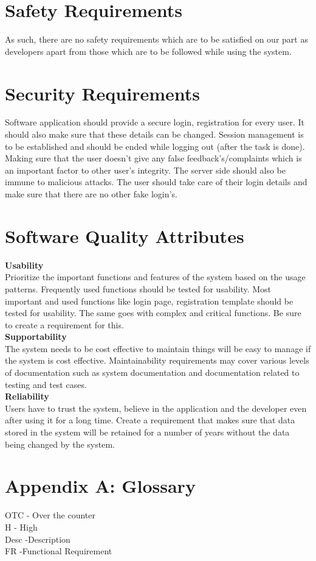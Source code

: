 \documentclass{scrreprt}
\begin{document}
\section{Safety Requirements}
As such, there are no safety requirements which are to be satisfied on our part as developers apart from those which are to be followed while using the system.

\section{Security Requirements}
Software application should provide a secure login, registration for every user. It should also make sure that these details can be changed. Session management is to be established and should be ended while logging out (after the task is done). Making sure that the user doesn't give any false feedback’s/complaints which is an important factor to other user's integrity. The server side should also be immune to malicious attacks. The user should take care of their login details and make sure that there are no other fake login's. 


\section{Software Quality Attributes}

 \textbf{Usability}\\
Prioritize the important functions and features of the system based on the usage patterns. Frequently used functions should be tested for usability. Most important and used functions like login page, registration template should be tested for usability. The same goes with complex and critical functions. Be sure to create a requirement for this.\\

 \textbf{Supportability}\\
The system needs to be cost effective to maintain things will be easy to manage if the system is cost effective. Maintainability requirements may cover various levels of documentation such as system documentation and documentation related to testing and test cases.\\

 \textbf{Reliability}  \\  
Users have to trust the system, believe in the application and the developer even after using it for a long time. Create a requirement that makes sure that data stored in the system will be retained for a number of years without the data being changed by the system.\\


\section{Appendix A: Glossary}
OTC  - Over the counter\\
H       - High\\
Desc  -Description\\
FR     -Functional Requirement\\
\end{document}
